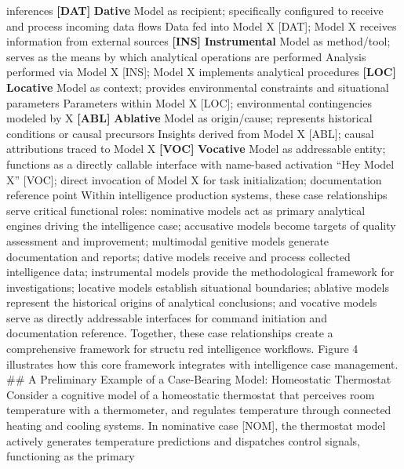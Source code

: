 \documentclass[
  11pt,
  letterpaper,
]{article}
\begin{document}
inferences \textbar{} \textbar{} \textbf{{[}DAT{]}} \textbar{}
\textbf{Dative} \textbar{} Model as recipient; specifically configured
to receive and process incoming data flows \textbar{} Data fed into
Model X {[}DAT{]}; Model X receives information from external sources
\textbar{} \textbar{} \textbf{{[}INS{]}} \textbar{}
\textbf{Instrumental} \textbar{} Model as method/tool; serves as the
means by which analytical operations are performed \textbar{} Analysis
performed via Model X {[}INS{]}; Model X implements analytical
procedures \textbar{} \textbar{} \textbf{{[}LOC{]}} \textbar{}
\textbf{Locative} \textbar{} Model as context; provides environmental
constraints and situational parameters \textbar{} Parameters within
Model X {[}LOC{]}; environmental contingencies modeled by X \textbar{}
\textbar{} \textbf{{[}ABL{]}} \textbar{} \textbf{Ablative} \textbar{}
Model as origin/cause; represents historical conditions or causal
precursors \textbar{} Insights derived from Model X {[}ABL{]}; causal
attributions traced to Model X \textbar{} \textbar{} \textbf{{[}VOC{]}}
\textbar{} \textbf{Vocative} \textbar{} Model as addressable entity;
functions as a directly callable interface with name-based activation
\textbar{} ``Hey Model X'' {[}VOC{]}; direct invocation of Model X for
task initialization; documentation reference point \textbar{} Within
intelligence production systems, these case relationships serve critical
functional roles: nominative models act as primary analytical engines
driving the intelligence case; accusative models become targets of
quality assessment and improvement; multimodal genitive models generate
documentation and reports; dative models receive and process collected
intelligence data; instrumental models provide the methodological
framework for investigations; locative models establish situational
boundaries; ablative models represent the historical origins of
analytical conclusions; and vocative models serve as directly
addressable interfaces for command initiation and documentation
reference. Together, these case relationships create a comprehensive
framework for structu red intelligence workflows. Figure 4 illustrates
how this core framework integrates with intelligence case management.
\#\# A Preliminary Example of a Case-Bearing Model: Homeostatic
Thermostat Consider a cognitive model of a homeostatic thermostat that
perceives room temperature with a thermometer, and regulates temperature
through connected heating and cooling systems. In nominative case
{[}NOM{]}, the thermostat model actively generates temperature
predictions and dispatches control signals, functioning as the primary
\end{document}
